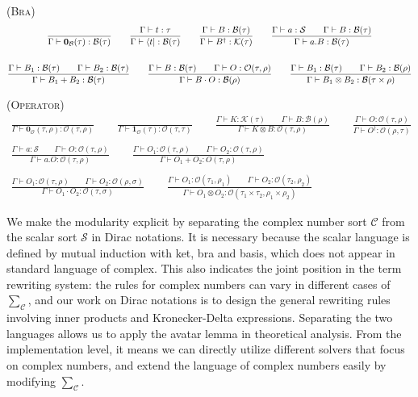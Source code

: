 \documentclass[manuscript, review, timestamp]{acmart}
\newcommand*{\Sc}{\mathcal{S}}
\newcommand*{\K}{\mathcal{K}}
\newcommand*{\B}{\mathcal{B}}
\newcommand*{\Op}{\mathcal{O}}
\begin{document}
\textsc{(Bra)}
\begin{gather*}
  \frac{}{\Gamma \vdash \mathbf{0}_{\mathcal{B}}(\tau) : \B(\tau)}
  \qquad
  \frac{\Gamma \vdash t : \tau}{\Gamma \vdash \bra{t} : \B(\tau)}
  \qquad
  \frac{\Gamma \vdash B : \B(\tau)}{\Gamma \vdash B^\dagger : \K(\tau)}
  \qquad
  \frac{\Gamma \vdash a : \Sc \qquad \Gamma \vdash B : \B(\tau)}{\Gamma \vdash a . B : \B(\tau)} \\
  \\
  \frac{\Gamma \vdash B_1 : \B(\tau) \qquad \Gamma \vdash B_2 : \B(\tau) }{\Gamma \vdash B_1 + B_2 : \B(\tau) }
  \qquad
  \frac{\Gamma \vdash B : \B(\tau) \qquad \Gamma \vdash O : \Op(\tau, \rho) }{\Gamma \vdash B \cdot O : \B(\rho) } 
  \qquad
  \frac{\Gamma \vdash B_1 : \B(\tau) \qquad \Gamma \vdash B_2 : \B(\rho) }{\Gamma \vdash B_1 \otimes B_2 : \B(\tau \times \rho)}
\end{gather*}

\textsc{(Operator)}
\begin{gather*}
  \frac{}{\Gamma \vdash \mathbf{0}_{\mathcal{O}}(\tau, \rho) : \Op(\tau, \rho)}
  \qquad
  \frac{}{\Gamma \vdash \mathbf{1}_{\mathcal{O}}(\tau) : \Op(\tau, \tau)}
  \qquad
  \frac{\Gamma \vdash K : \K(\tau) \qquad \Gamma \vdash B : \B(\rho) }{\Gamma \vdash K \otimes B : \Op(\tau, \rho)}
  \qquad
  \frac{\Gamma \vdash O : \Op(\tau, \rho)}{\Gamma \vdash O^\dagger : \Op(\rho, \tau)} \\
  \\
  \frac{\Gamma \vdash a : \Sc \qquad \Gamma \vdash O : \Op(\tau, \rho)}{\Gamma \vdash a . O : \Op(\tau, \rho)}
  \qquad
  \frac{\Gamma \vdash O_1 : \Op(\tau, \rho) \qquad \Gamma \vdash O_2 : \Op(\tau, \rho) }{\Gamma \vdash O_1 + O_2 : O(\tau, \rho) } \\
  \\
  \frac{\Gamma \vdash O_1 : \Op(\tau, \rho) \qquad \Gamma \vdash O_2 : \Op(\rho, \sigma) }{\Gamma \vdash O_1 \cdot O_2 : \Op(\tau, \sigma) }
  \qquad
  \frac{\Gamma \vdash O_1 : \Op(\tau_1, \rho_1) \qquad \Gamma \vdash O_2 : \Op(\tau_2, \rho_2) }{\Gamma \vdash O_1 \otimes O_2 : \Op(\tau_1 \times \tau_2, \rho_1 \times \rho_2)}
\end{gather*}


We make the modularity explicit by separating the complex number sort $\mathcal{C}$ from the scalar sort $\mathcal{S}$ in Dirac notations. It is necessary because the scalar language is defined by mutual induction with ket, bra and basis, which does not appear in standard language of complex. This also indicates the joint position in the term rewriting system: the rules for complex numbers can vary in different cases of $\sum_\mathcal{C}$, and our work on Dirac notations is to design the general rewriting rules involving inner products and Kronecker-Delta expressions. Separating the two languages allows us to apply the avatar lemma in theoretical analysis. From the implementation level, it means we can directly utilize different solvers that focus on complex numbers, and extend the language of complex numbers easily by modifying $\sum_\mathcal{C}$.
\end{document}
